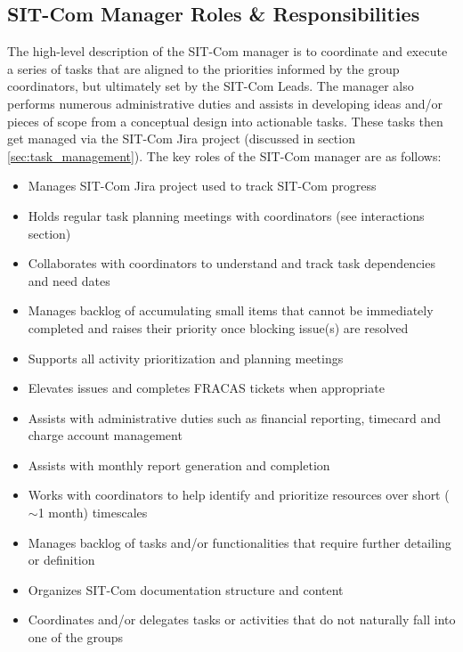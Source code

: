 \documentclass[SE,lsstdraft,authoryear,toc]{lsstdoc}
\begin{document}
\subsection{SIT-Com Manager Roles \& Responsibilities}
\label{sec:manager_r_and_rs}
The high-level description of the SIT-Com manager is to coordinate and execute a series of tasks that are aligned to the priorities informed by the group coordinators, but ultimately set by the SIT-Com Leads.
The manager also performs numerous administrative duties and assists in developing ideas and/or pieces of scope from a conceptual design into actionable tasks.
These tasks then get managed via the SIT-Com Jira project (discussed in section \ref{sec:task_management}). The key roles of the SIT-Com manager are as follows:
\begin{itemize}
    \item Manages SIT-Com Jira project used to track SIT-Com progress
    \item Holds regular task planning meetings with coordinators (see interactions section)
    \item Collaborates with coordinators to understand and track task dependencies and need dates
    \item Manages backlog of accumulating small items that cannot be immediately completed and raises their priority once blocking issue(s) are resolved
    \item Supports all activity prioritization and planning meetings
    \item Elevates issues and completes FRACAS tickets when appropriate
    \item Assists with administrative duties such as financial reporting, timecard and charge account management
    \item Assists with monthly report generation and completion
    \item Works with coordinators to help identify and prioritize resources over short ($\sim$1 month) timescales
    \item Manages backlog of tasks and/or functionalities that require further detailing or definition
    \item Organizes SIT-Com documentation structure and content
    \item Coordinates and/or delegates tasks or activities that do not naturally fall into one of the groups
\end{itemize}
\end{document}
